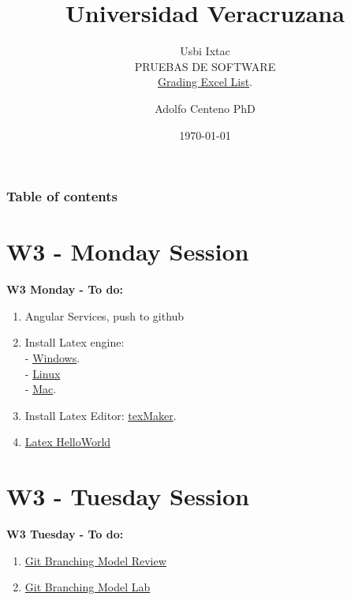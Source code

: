 \documentclass{beamer}
\begin{document}
\title{Universidad Veracruzana}  
\subtitle{Usbi Ixtac\\PRUEBAS DE SOFTWARE\\\href{https://drive.google.com/file/d/1x-8DA-Xe7fQfKMPQY9XWx86y6o0Z-NRR/view?usp=sharing}{Grading Excel List}.
}
\author{Adolfo Centeno PhD}
\date{\today} 


\begin{frame}
\titlepage
\end{frame}

\begin{frame}\frametitle{Table of contents}
\tableofcontents
\end{frame} 


\section{W3 - Monday Session  }

\begin{frame}

\textbf{W3 Monday - To do:}

\begin{enumerate}
\item
	Angular Services, push to github 
\item
    Install Latex engine:  \\
    - \href{https://miktex.org/download}{Windows}. \\
    - \href{https://dzone.com/articles/installing-latex-ubuntu}{Linux} \\
    - \href{http://www.tug.org/mactex/mactex-download.html}{Mac}. 
\item
	Install Latex Editor: \href{https://www.xm1math.net/texmaker/download.html}{texMaker}.	
\item
	\href{https://github.com/adsoftsito/tdd/blob/master/w3/helloworld.tex}{Latex HelloWorld} 

	

\end{enumerate} 

\end{frame}


\section{W3 - Tuesday Session }

\begin{frame}

\textbf{W3 Tuesday - To do:}

\begin{enumerate}
\item
	\href{https://github.com/adsoftsito/tdd/blob/master/w3/gitbranchingmodel.pdf}{Git Branching Model Review} 

\item
	\href{https://github.com/adsoftsito/tdd/blob/master/w3/gitbranchinglab.pdf}{Git Branching Model Lab} 

\end{enumerate} 

\end{frame}
\end{document}
